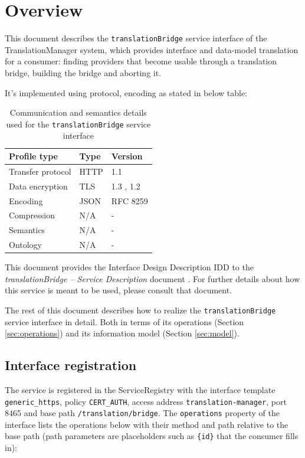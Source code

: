 \documentclass[a4paper]{arrowhead}
\begin{document}
\section{Overview}
\label{sec:overview}

This document describes the \texttt{translationBridge} service interface of the TranslationManager system, which provides interface and data-model translation for a consumer: finding providers that become usable through a translation bridge, building the bridge and aborting it.

It's implemented using protocol, encoding as stated in below table:
\begin{table}[ht!]
  \centering
  \begin{tabular}{|l|l|l|}
    \hline
    \rowcolor{gray!33} Profile type & Type & Version \\ \hline
    Transfer protocol & HTTP & 1.1 \cite{rfc9112} \\ \hline
    Data encryption & TLS & 1.3 \cite{rfc8446}, 1.2 \cite{rfc5246} \\ \hline
    Encoding & JSON & RFC 8259 \cite{rfc8259} \\ \hline
    Compression & N/A & - \\ \hline
    Semantics & N/A & - \\ \hline
    Ontology & N/A & - \\ \hline
  \end{tabular}
  \caption{Communication and semantics details used for the \texttt{translationBridge} service interface}
  \label{tab:comunication_semantics_profile}
\end{table}

This document provides the Interface Design Description IDD to the \textit{translationBridge -- Service Description} document \cite{tm-translationBridge-sd}.
For further details about how this service is meant to be used, please consult that document.

The rest of this document describes how to realize the \texttt{translationBridge} service
interface in detail. Both in terms of its operations (Section \ref{sec:operations}) and its information model (Section \ref{sec:model}).

\subsection{Interface registration}

The service is registered in the ServiceRegistry with the interface template \texttt{generic\_\allowbreak{}https}, policy \texttt{CERT\_\allowbreak{}AUTH}, access address \texttt{translation-\allowbreak{}manager}, port 8465 and base path \texttt{/\allowbreak{}translation/\allowbreak{}bridge}. The \texttt{operations} property of the interface lists the operations below with their method and path relative to the base path (path parameters are placeholders such as \texttt{\{id\}} that the consumer fills in):
\end{document}
